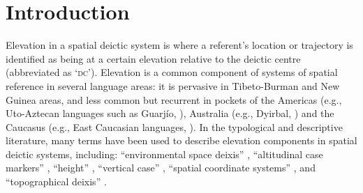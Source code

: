 
 
\section{Introduction}  

Elevation in a spatial deictic system is where a referent's location or trajectory is identified as being at a certain elevation relative to the deictic centre (abbreviated as `\textsc{dc}'). Elevation is a common component of systems of spatial reference in several language areas: it is pervasive in Tibeto-Burman \citep{Bickel2001,Cheung2007,Post2011} and New Guinea \citep{Senft1997,Senft2004,Diessel1999,Levinson1983} areas, and less common but recurrent in pockets of the Americas (e.g., Uto-Aztecan languages such as Guarj\'io, \citet{Miller1996}), Australia (e.g., Dyirbal, \citealt[48]{Dixon1972}) and the Caucasus (e.g., East Caucasian languages, \citealt{Schulze2003}). In the typological and descriptive literature, many terms have been used to describe elevation components in spatial deictic systems, including: ``environmental space deixis'' \citep{Bickel2001}, ``altitudinal case markers'' \citep{Ebert2003}, ``height'' \citep{Dixon2003}, ``vertical case'' \citep{Noonan2006}, ``spatial coordinate systems'' \citep{Burenhult2008}, and ``topographical deixis'' \citep{Post2011}. 

